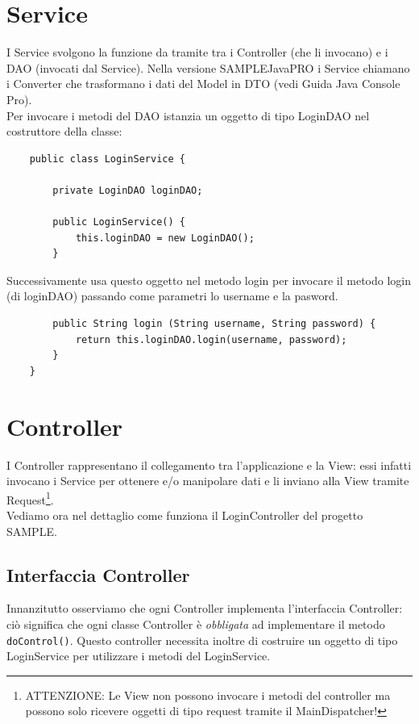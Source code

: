 \documentclass[a4paper,12 pt]{article}
\begin{document}
	\section{Service}
	I Service svolgono la funzione da tramite tra i Controller (che li invocano) e i DAO (invocati dal Service). Nella versione SAMPLEJavaPRO i Service chiamano i Converter che trasformano i dati del Model in DTO (vedi Guida Java Console Pro).\\
	
	Per invocare i metodi del DAO istanzia un oggetto di tipo LoginDAO nel costruttore della classe:
	\begin{lstlisting}
	public class LoginService {
	
		private LoginDAO loginDAO;

		public LoginService() {
			this.loginDAO = new LoginDAO();
		}
	\end{lstlisting}
	
	Successivamente usa questo oggetto nel metodo login per invocare il metodo login (di loginDAO) passando come parametri lo username e la pasword.
	\begin{lstlisting}
		public String login (String username, String password) {
			return this.loginDAO.login(username, password);
		}
	}	
	\end{lstlisting}
	
	\section{Controller}
	I Controller rappresentano il collegamento tra l'applicazione e la View: essi infatti invocano i Service per ottenere e/o manipolare dati e li inviano alla View tramite Request\footnote{ATTENZIONE: Le View non possono invocare i metodi del controller ma possono solo ricevere oggetti di tipo request tramite il MainDispatcher!}.\\
	
	Vediamo ora nel dettaglio come funziona il LoginController del progetto SAMPLE.
	\subsection{Interfaccia Controller}
	Innanzitutto osserviamo che ogni Controller implementa l'interfaccia Controller: ciò significa che ogni classe Controller è \textit{obbligata} ad implementare il metodo \texttt{doControl()}. Questo controller necessita inoltre di costruire un oggetto di tipo LoginService per utilizzare i metodi del LoginService.
\end{document}

